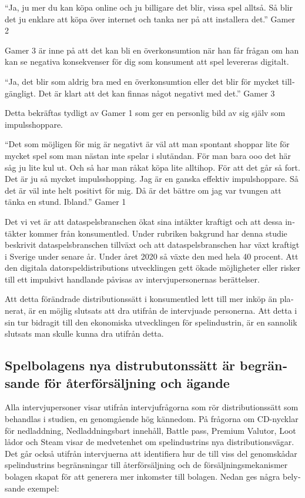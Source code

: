 \documentclass[11p]{article}
\begin{document}
\begin{otherlanguage}{swedish}
    \setlength{\leftskip}{1cm}
    “Ja, ju mer du kan köpa online och ju billigare det blir, vissa spel alltså. Så blir det ju enklare att köpa över internet och tanka ner på att installera det.” Gamer 2

    \setlength{\leftskip}{0cm}
    Gamer 3 är inne på att det kan bli en överkonsumtion när han får frågan om han kan se negativa konsekvenser för dig som konsument att spel levereras digitalt.

    \setlength{\leftskip}{1cm}
    “Ja, det blir som aldrig bra med en överkonsumtion eller det blir för  mycket tillgängligt. Det är klart att det kan finnas något negativt med det.” Gamer 3


    \setlength{\leftskip}{0cm}
    Detta bekräftas tydligt av Gamer 1 som ger en personlig bild av sig själv som impulsshoppare.

    \setlength{\leftskip}{1cm}
    “Det som möjligen för mig är negativt är väl att man spontant shoppar lite för mycket spel som man nästan inte spelar i slutändan. För man bara ooo det här såg ju lite kul ut. Och så har man råkat köpa lite alltihop. För att det går så fort. Det är ju så mycket impulsshopping. Jag är en ganska effektiv impulshoppare. Så det är väl inte helt positivt för mig. Då är det bättre om jag var tvungen att tänka en stund. Ibland.” Gamer 1

    \setlength{\leftskip}{0cm}
    Det vi vet är att dataspelsbranschen ökat sina intäkter kraftigt och att dessa intäkter kommer från konsumentled. Under rubriken bakgrund har denna studie beskrivit dataspelsbranschen tillväxt och att dataspelsbranschen har växt kraftigt i Sverige under senare år. Under året 2020 så växte den med hela 40 procent.
    Att den digitala datorspeldistributions utvecklingen gett ökade möjligheter eller risker till ett impulsivt handlande påvisas av intervjupersonernas berättelser.

    Att detta förändrade distributionssätt i konsumentled lett till mer inköp än planerat, är en möjlig slutsats att dra utifrån de intervjuade personerna. Att detta i sin tur bidragit till den ekonomiska utvecklingen för spelindustrin, är en sannolik slutsats man skulle kunna dra utifrån detta.

    \subsection{Spelbolagens nya distrubutonssätt är begränsande för återförsäljning och ägande  }
    Alla intervjupersoner visar utifrån intervjufrågorna som rör distributionssätt som behandlas i studien, en genomgående hög kännedom.   På frågorna om CD-nycklar för nedladdning, Nedladdningsbart innehåll, Battle pass, Premium Valutor, Loot lådor och Steam visar de medvetenhet om spelindustrins nya distributionsvägar. Det går också utifrån intervjuerna att identifiera hur de till viss del genomskådar spelindustrins begränsningar till återförsäljning och de försäljningsmekanismer bolagen skapat för att generera mer inkomster till bolagen.
    Nedan ges några belysande exempel:


\end{otherlanguage}
\end{document}
